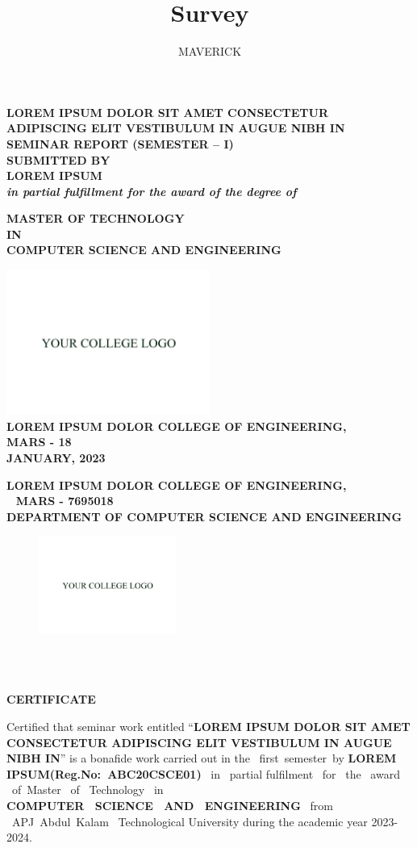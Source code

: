 \documentclass[a4paper,12pt]{report}
\title{Survey}
\author{MAVERICK}
\newcommand*{\plogo}{
    \includegraphics[width=0.5\textwidth]{college_logo.png}
}
\newcommand*{\titleGP}{\begingroup %
\centering %
\vspace*{-25pt} %

\textbf{
{\Large{ LOREM IPSUM DOLOR SIT AMET CONSECTETUR ADIPISCING ELIT VESTIBULUM IN AUGUE NIBH IN}\\[\baselineskip] %
}}
\textbf{SEMINAR REPORT (SEMESTER – I)}\\
[\baselineskip]
\textbf{SUBMITTED BY}\\
[\baselineskip]
\textbf{LOREM IPSUM}\\

\textbf{\textit{in partial fulfillment for the award of the degree of}}\\
[\baselineskip]

\par %

\vspace*{.6cm}%

{\Large \textbf{MASTER OF TECHNOLOGY} \\ \textbf{IN} \\ \textbf{COMPUTER SCIENCE AND ENGINEERING}\\ \par} %


\vspace*{2cm}%

\plogo \\[0.1\baselineskip] %

{\large \textbf{LOREM IPSUM DOLOR COLLEGE OF ENGINEERING,}\\
\textbf{MARS - 18}\\
\textbf{JANUARY, 2023}\\[\baselineskip]}\par %
\newpage
\endgroup}
\begin{document}
\titleGP %


\thispagestyle{empty}

\begin{center}
  \textbf{\large LOREM IPSUM DOLOR COLLEGE OF ENGINEERING,}\\
 
  \textbf{MARS - 7695018}\\

  \textbf{DEPARTMENT OF COMPUTER SCIENCE AND ENGINEERING}
  \newline
    \newline
  \begin{figure}[h!]
    \begin{center}
      \includegraphics[width=0.4\textwidth]{college_logo.png}
      \end{center}
  \end{figure}
  \\[0.1\baselineskip]
 
   
  \Large \textbf{CERTIFICATE}\\
  [\baselineskip]
  \end{center}
  \par \hspace{.5cm}
Certified  that  seminar  work  entitled “\textbf{LOREM IPSUM DOLOR SIT AMET
CONSECTETUR ADIPISCING ELIT VESTIBULUM IN AUGUE NIBH IN}”  is a   bonafide   work   carried out in the \  first\ semester\  by \textbf{LOREM IPSUM(Reg.No:\ ABC20CSCE01)} \ in \ partial  fulfilment    \  for   \  the   \  award  \   of\  Master     \  of          \   Technology \  in \\  \textbf{COMPUTER \ SCIENCE \ AND \ ENGINEERING}   \    from \ APJ\  Abdul\  Kalam \ Technological University during the academic year 2023-2024.

\vspace{1.0cm}
\end{document}

